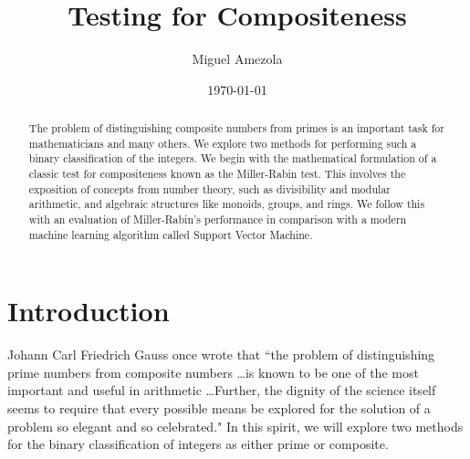 \documentclass[10pt, titlepage]{amsart}
\title{Testing for Compositeness}
\author{Miguel Amezola %
}
\date{\today}
\theoremstyle{definition}
\begin{document}
	
	\lstset{language=Python}          %
		
	
	\begin{abstract}
		The problem of distinguishing composite numbers from primes is an important task for mathematicians and many others.
		We explore two methods for performing such a binary classification of the integers.		
		We begin with the mathematical formulation of a classic test for compositeness known as the Miller-Rabin test.
		This involves the exposition of concepts from number theory, such as divisibility and modular arithmetic, and algebraic structures like monoids, groups, and rings.
		We follow this with an evaluation of Miller-Rabin's performance in comparison with a modern machine learning algorithm called Support Vector Machine.
	\end{abstract}

	\maketitle
	
	\tableofcontents
	\newpage
	
	
	\section{Introduction}
	Johann Carl Friedrich Gauss once wrote that ``the problem of distinguishing prime numbers from composite numbers \ldots is known to be one of the most important and useful in arithmetic \ldots Further, the dignity of the science itself seems to require that every possible means be explored for the solution of a problem so elegant and so celebrated."\cite{gauss}
	In this spirit, we will explore two methods for the binary classification of integers as either prime or composite. 


		
	
\end{document}
